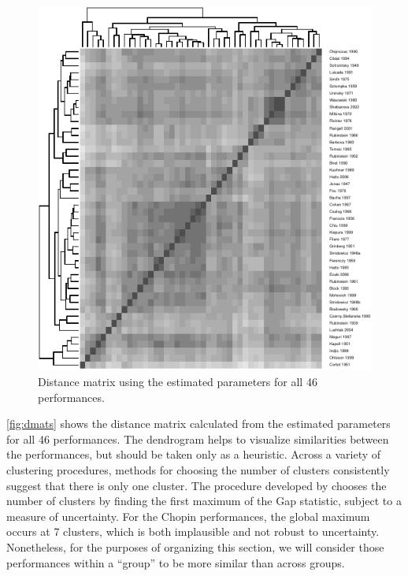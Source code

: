 \documentclass[aoas]{imsart}
\begin{document}
\begin{figure}[t]
  \centering
  \includegraphics[width=.65\linewidth]{parametric-clusters-2}
  \caption{Distance matrix using the estimated parameters for all 46 performances. }
  \label{fig:dmats}
\end{figure}
\autoref{fig:dmats} shows the distance matrix calculated from the
estimated parameters for all 46 performances. The dendrogram helps to
visualize similarities between the performances, but should be taken
only as a heuristic. Across a variety of clustering procedures,
methods for choosing the number of clusters
\citep[e.g.,][]{TibshiraniWalther2001,DudoitFridlyand2002}
consistently suggest that there is only one cluster. The procedure
developed by \citet{TibshiraniWalther2001} chooses the number of
clusters by finding the first maximum of the Gap statistic, subject to
a measure of uncertainty. For the Chopin performances, the global maximum
occurs at 7 clusters, which is both implausible and not robust to
uncertainty. Nonetheless, for the purposes of organizing this section,
we will consider those performances within a ``group''  to be
more similar than across groups.
\end{document}
